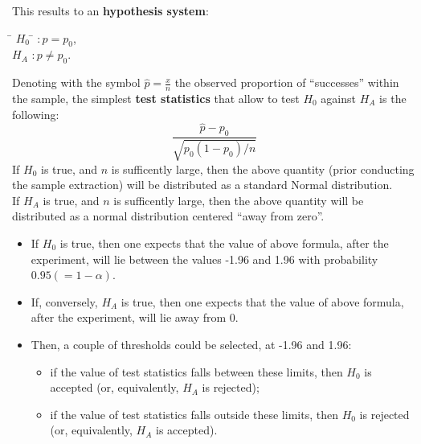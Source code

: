 \begin{frame}
  This results to an \textbf{hypothesis system}:
  \vspace{-0.25cm} 
  \begin{tabbing}
    \=  $ H_0 $ \= $ :  p = p_0 $,\\
    \>  $ H_A $ \> $ :  p \neq p_0 $.\\
  \end{tabbing}
  \vspace{-0.75cm} 
  Denoting with the symbol $ \hat{p} = \frac{x}{n} $ the observed proportion of ``successes'' within the sample, the simplest \textbf{test statistics} that allow to test $H_0$ against $H_A$ is the following:
  $$ \frac{\hat{p} - p_0}{\sqrt{p_0 (1-p_0) / n}} $$
  If $H_0$ is true, and $n$ is sufficently large, then the above quantity (prior conducting the sample extraction) will be distributed as a standard Normal distribution.\\
  If $H_A$ is true, and $n$ is sufficently large, then the above quantity will be distributed as a normal distribution centered ``away from zero''.
\end{frame}

\begin{frame}
 \begin{itemize}
  \vspace{0.5cm}
  \item If $H_0$ is true, then one expects that the value of above formula, after the experiment, will lie between the values -1.96 and 1.96 with probability $0.95 (=1-\alpha)$.
  \vspace{0.5cm}
  \item If, conversely, $H_A$ is true, then one expects that the value of above formula, after the experiment, will lie away from 0.
  \vspace{0.5cm}
  \item Then, a couple of thresholds could be selected, at -1.96 and 1.96: 
  \begin{itemize}
    \item if the value of test statistics falls between these limits, then $H_0$ is accepted (or, equivalently, $H_A$ is rejected); 
    \item if the value of test statistics falls outside these limits, then $H_0$ is rejected (or, equivalently, $H_A$ is accepted).
  \end{itemize}
 \end{itemize}
\end{frame}


